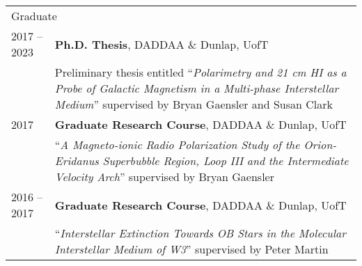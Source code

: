 \documentclass[10pt]{res} %
\begin{document}
\begin{resume}
\begin{table}[h!]
\begin{tabularx}{\textwidth}{ @{} p{6.5em} X @{} }
\multicolumn{2}{l}{ \rule{0pt}{3ex} \large \hspace{-12pt} Graduate \dotfill \rule[-1.2ex]{0pt}{0pt}} \\
2017 -- 2023 & \textbf{Ph.D. Thesis}, DADDAA \& Dunlap, UofT \\
                     & Preliminary thesis entitled ``\textit{Polarimetry and 21 cm HI as a Probe of Galactic Magnetism in a Multi-phase Interstellar Medium}'' supervised by Bryan Gaensler and Susan Clark \\
2017 & \textbf{Graduate Research Course}, DADDAA \& Dunlap, UofT \\
         & ``\textit{A Magneto-ionic Radio Polarization Study of the Orion-Eridanus Superbubble Region, Loop III and the Intermediate Velocity Arch}'' supervised by Bryan Gaensler \\
2016 -- 2017 & \textbf{Graduate Research Course}, DADDAA \& Dunlap, UofT  \\
                     & ``\textit{Interstellar Extinction Towards OB Stars in the Molecular Interstellar Medium of W3}'' supervised by Peter Martin
\end{tabularx}
\end{table}


\end{resume}
\end{document}
